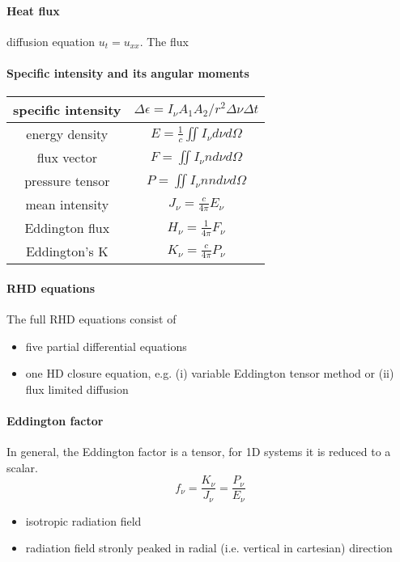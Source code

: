 \documentclass[../main/main.tex]{subfiles}
\begin{document}
\paragraph{Heat flux}
diffusion equation $u_t = u_{xx}$. The flux  

\paragraph{Specific intensity and its angular moments}

\begin{center}
\centering
{\tabulinesep=1.5mm
\begin{tabu}{|c|c|}
\hline 
specific intensity & $\Delta \epsilon = \boxed{I_{\nu}} A_1 A_2/r^2 \Delta \nu \Delta t$ \\ \hline
energy density & $E = \frac{1}{c} \iint I_{\nu} d\nu d\Omega$ \\ \hline
flux vector & $F = \iint I_{\nu}n d\nu d\Omega$ \\ \hline
pressure tensor & $P = \iint I_{\nu} nn d\nu d\Omega$ \\ \hline
mean intensity & $J_{\nu} = \frac{c}{4 \pi} E_{\nu}$ \\ \hline
Eddington flux & $H_{\nu} = \frac{1}{4 \pi} F_{\nu}$ \\ \hline
Eddington's K & $K_{\nu} = \frac{c}{4 \pi}P_{\nu}$ \\ \hline
\end{tabu}}
\end{center}



\paragraph{RHD equations}
The full RHD equations consist of 
\begin{itemize}
\item five partial differential equations
\item one HD closure equation, e.g. (i) variable Eddington tensor method or (ii) flux limited diffusion
\end{itemize}

\paragraph{Eddington factor}
In general, the Eddington factor is a tensor, for 1D systems it is reduced to a scalar.
\begin{equation}
f_{\nu} = \frac{K_{\nu}}{J_{\nu}} = \frac{P_{\nu}}{E_{\nu}}
\end{equation}
\begin{itemize}
\item isotropic radiation field
\item radiation field stronly peaked in radial (i.e. vertical in cartesian) direction
\end{itemize}
\end{document}
